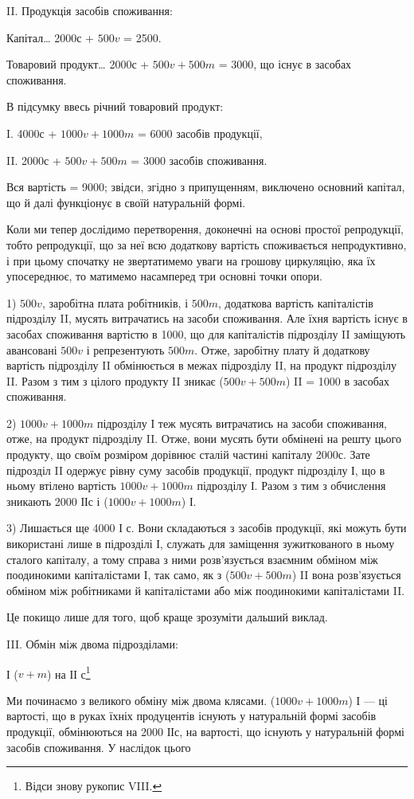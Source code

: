 \parcont{}  %
II. Продукція засобів споживання:

Капітал\dots{} 2000с + $500v$ = 2500.

Товаровий продукт\dots{} 2000с + $500v + 500m$ = 3000, що існує в
засобах споживання.

В підсумку ввесь річний товаровий продукт:

I.    4000с + $1000v + 1000m$ = 6000 засобів продукції,

II.    2000с + $500v + 500m$ = 3000 засобів споживання.

Вся вартість = 9000; звідси, згідно з припущенням, виключено основний
капітал, що й далі функціонує в своїй натуральній формі.

Коли ми тепер дослідимо перетворення, доконечні на основі простої
репродукції, тобто репродукції, що за неї всю додаткову вартість
споживається непродуктивно, і при цьому спочатку не звертатимемо уваги
на грошову циркуляцію, яка їх упосереднює, то матимемо насамперед
три основні точки опори.

1) $500v$, заробітна плата робітників, і $500m$, додаткова вартість капіталістів
підрозділу II, мусять витрачатись на засоби споживання. Але
їхня вартість існує в засобах споживання вартістю в 1000, що для капіталістів
підрозділу II заміщують авансовані $500v$ і репрезентують $500m$.
Отже, заробітну плату й додаткову вартість підрозділу II обмінюється
в межах підрозділу II, на продукт підрозділу II. Разом з тим з цілого
продукту II зникає ($500v + 500m$) II = 1000 в засобах споживання.

2) $1000v + 1000m$ підрозділу І теж мусять витрачатись на засоби
споживання, отже, на продукт підрозділу II. Отже, вони мусять бути обмінені
на решту цього продукту, що своїм розміром дорівнює сталій
частині капіталу 2000с. Зате підрозділ II одержує рівну суму засобів
продукції, продукт підрозділу І, що в ньому втілено вартість $1000v +
1000m$ підрозділу І. Разом з тим з обчислення зникають 2000 ІІс і
($1000v + 1000m$) І.

3) Лишається ще 4000 І с. Вони складаються з засобів продукції, які
можуть бути використані лише в підрозділі І, служать для заміщення
зужиткованого в ньому сталого капіталу, а тому справа з ними розв’язується
взаємним обміном між поодинокими капіталістами І, так само, як
з ($500v + 500m$) II вона розв’язується обміном між робітниками й капіталістами
або між поодинокими капіталістами II.

Це покищо лише для того, щоб краще зрозуміти дальший виклад.

III. Обмін між двома підрозділами:

І ($v + m$) на ІІ с\footnote{
Відси знову рукопис VIII.
}

Ми починаємо з великого обміну між двома клясами. ($1000v +
1000m$) І — ці вартості, що в руках їхніх продуцентів існують у натуральній
формі засобів продукції, обмінюються на 2000 ІІс, на вартості,
що існують у натуральній формі засобів споживання. У наслідок цього
\parbreak{}  %
